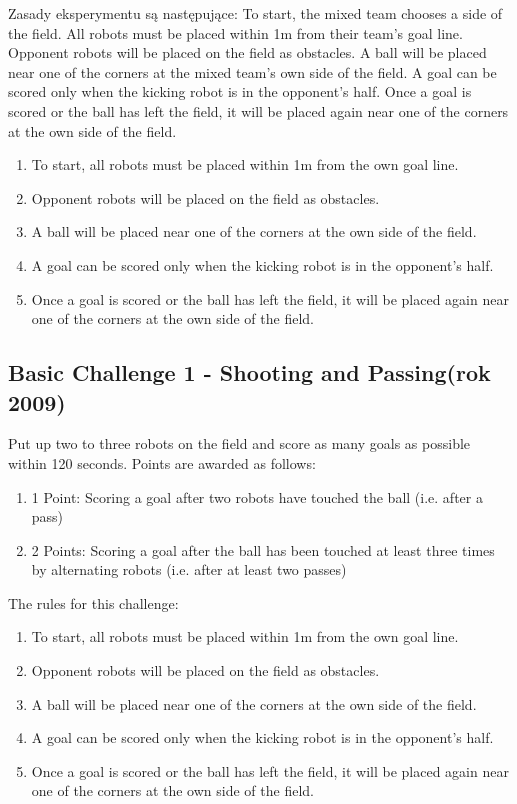 \documentclass[11pt,onecolumn,a4paper,final]{article}
\begin{document}
Zasady eksperymentu są następujące:
To start, the mixed team chooses a side of the field. All robots must be placed within 1m from their team's goal line. Opponent robots will be placed on the field as obstacles. 
A ball will be placed near one of the corners at the mixed team's own side of the field. 
A goal can be scored only when the kicking robot is in the opponent's half.
Once a goal is scored or the ball has left the field, it will be placed again near one of the corners at the own side of the field.
\begin{enumerate}
    \item  To start, all robots must be placed within 1m from the own goal line.
    
    \item  Opponent robots will be placed on the field as obstacles.
    
    \item  A ball will be placed near one of the corners at the own side of the field.
    
    \item  A goal can be scored only when the kicking robot is in the opponent's half.
    
    \item  Once a goal is scored or the ball has left the field, it will be placed again near one of the corners at the own side of the field.
\end{enumerate}

\subsection*{ Basic Challenge 1 - Shooting and Passing(rok 2009)}

Put up two to three robots on the field and score as many goals as possible within 120 seconds. Points are awarded as follows:

\begin{enumerate}
    \item  1 Point: Scoring a goal after two robots have touched the ball (i.e. after a pass)
    \item  2 Points: Scoring a goal after the ball has been touched at least three times by alternating robots (i.e. after at least two passes)
\end{enumerate}

The rules for this challenge:
\begin{enumerate}
    \item  To start, all robots must be placed within 1m from the own goal line.
    \item  Opponent robots will be placed on the field as obstacles.
    \item  A ball will be placed near one of the corners at the own side of the field.
    \item  A goal can be scored only when the kicking robot is in the opponent's half.
    \item  Once a goal is scored or the ball has left the field, it will be placed again near one of the corners at the own side of the field.
\end{enumerate}
\end{document}
